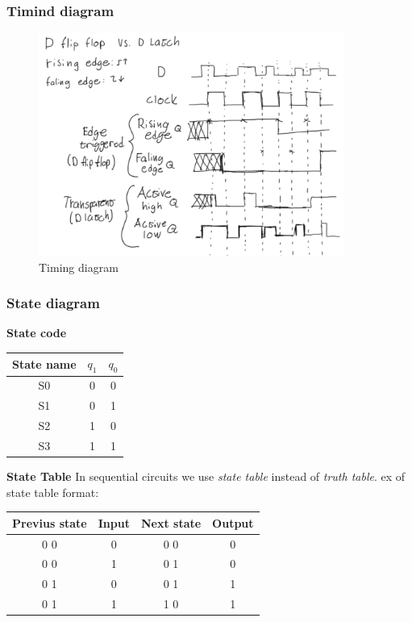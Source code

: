 \subsubsection{Timind diagram}
\begin{figure}[h]
    \vspace{10mm}
    \centering
    \includegraphics[width=10cm]{image/timing-diagram.pdf}
    \caption{Timing diagram}
\end{figure}


\subsubsection{State diagram}
\textbf{State code}
\begin{center}
\begin{tabular}{ | c | c c | }
    \hline
 State name & $q_1$ & $q_0$  \\ 
    \hline
 S0 & 0 & 0 \\
    \hline
 S1 & 0 & 1 \\
    \hline
 S2 & 1 & 0 \\
    \hline
 S3 & 1 & 1 \\
    \hline
\end{tabular}
\end{center}


\textbf{State Table}
In sequential circuits we use \textit{state table} instead of \textit{truth table}.
ex of state table format:
\begin{center}
\begin{tabular}{ | c | c | c | c | }
    \hline
 Previus state & Input & Next state & Output \\ 
    \hline
 0 0 & 0 & 0 0 & 0 \\ 
    \hline
 0 0 & 1 & 0 1 & 0 \\ 
    \hline
 0 1 & 0 & 0 1 & 1 \\ 
    \hline
 0 1 & 1 & 1 0 & 1 \\ 
    \hline
\end{tabular}
\end{center}


